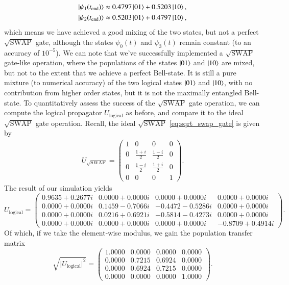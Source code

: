 \documentclass{subfiles}
\begin{document}
\begin{align*}
    \ket{\psi_1(t_{\text{end}})} &\approx 0.4797 \ket{01} + 0.5203 \ket{10}, \\
    \ket{\psi_2(t_{\text{end}})} &\approx 0.5203 \ket{01} + 0.4797 \ket{10},
\end{align*}
which means we have achieved a good mixing of the two states, but not a perfect $\sqrt{\text{SWAP}}$ gate, although the states $\psi_0(t)$ and $\psi_3(t)$ remain constant (to an accuracy of $10^{-5}$). We can note that we've successfully implemented a $\sqrt{\text{SWAP}}$ gate-like operation, where the populations of the states $\ket{01}$ and $\ket{10}$ are mixed, but not to the extent that we achieve a perfect Bell-state. It is still a pure mixture (to numerical accuracy) of the two logical states $\ket{01}$ and $\ket{10}$, with no contribution from higher order states, but it is not the maximally entangled Bell-state. 
To quantitatively assess the success of the $\sqrt{\text{SWAP}}$ gate operation, we can compute the logical propagator $U_{\text{logical}}$ as before, and compare it to the ideal $\sqrt{\text{SWAP}}$ gate operation. Recall, the ideal $\sqrt{\text{SWAP}}$ \ref{eq:sqrt_swap_gate} is given by 
\begin{align*}
    U_{\sqrt{\text{SWAP}}} = \begin{pmatrix}
        1 & 0 & 0 & 0 \\
        0 & \frac{1 + i}{2} & \frac{1 - i}{2} & 0 \\
        0 & \frac{1 - i}{2} & \frac{1 + i}{2} & 0 \\
        0 & 0 & 0 & 1
    \end{pmatrix}.
\end{align*}
The result of our simulation yields
\begin{equation}
U_{\mathrm{logical}}
=
\begin{pmatrix}
 0.9635 + 0.2677i & 0.0000 + 0.0000i & 0.0000 + 0.0000i & 0.0000 + 0.0000i\\
 0.0000 + 0.0000i & 0.1459 - 0.7066i & -0.4472 - 0.5286i & 0.0000 + 0.0000i\\
 0.0000 + 0.0000i & 0.0216 + 0.6921i & -0.5814 - 0.4273i & 0.0000 + 0.0000i\\
 0.0000 + 0.0000i & 0.0000 + 0.0000i & 0.0000 + 0.0000i & -0.8709 + 0.4914i
\end{pmatrix}.
\end{equation}
Of which, if we take the element-wise modulus, we gain the population transfer matrix
\begin{equation}
\sqrt{\lvert U_{\mathrm{logical}}\rvert^2}
=\begin{pmatrix}
1.0000 & 0.0000 & 0.0000 & 0.0000\\
0.0000 & 0.7215 & 0.6924 & 0.0000\\
0.0000 & 0.6924 & 0.7215 & 0.0000\\
0.0000 & 0.0000 & 0.0000 & 1.0000
\end{pmatrix}.
\end{equation}
\end{document}
